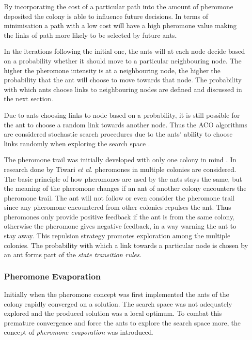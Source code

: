 By incorporating the cost of a particular path into the amount of pheromone deposited the colony is able to influence future decisions\cite{CompuIntelligenceIntro}. In terms of minimisation a path with a low cost will have a high pheromone value making the links of path more likely to be selected by future ants\cite{CompuIntelligenceIntro}.

In the iterations following the initial one, the ants will at each node decide based on a probability whether it should move to a particular neighbouring node. The higher the pheromone intensity is at a neighbouring node, the higher the probability that the ant will choose to move towards that node\cite{AntQAP,AntsAndStigmergy,CompuIntelligenceIntro}. The probability with which ants choose links to neighbouring nodes are defined and discussed in the next section.

Due to ants choosing links to node based on a probability, it is still possible for the ant to choose a random link towards another node. Thus the \gls{ACO} algorithms are considered stochastic search procedures due to the ants' ability to choose links randomly when exploring the search space \cite{ACOSurvey,ImpACOComplex}.

The pheromone trail was initially developed with only one colony in mind \cite{CompuIntelligenceIntro}. In research done by Tiwari \emph{et al.}\cite{ACOLargeProblem} pheromones in multiple colonies are considered. The basic principle of how pheromones are used by the ants stays the same, but the meaning of the pheromone changes if an ant of another colony encounters the pheromone trail\cite{AntQAP,AntsAndStigmergy,CompuIntelligenceIntro}. The ant will not follow or even consider the pheromone trail since any pheromone encountered from other colonies repulses the ant\cite{ACOLargeProblem}. Thus pheromones only provide positive feedback if the ant is from the same colony, otherwise the pheromone gives negative feedback, in a way warning the ant to stay away\cite{ACOLargeProblem}. This repulsion strategy promotes exploration among the multiple colonies\cite{ACOLargeProblem}. The probability with which a link towards a particular node is chosen by an ant forms part of the \emph{state transition rules}.

\subsubsection{Pheromone Evaporation}
\label{sec:pheromoneevapuation}
Initially when the pheromone concept was first implemented the ants of the colony rapidly converged on a solution\cite{CompuIntelligenceIntro}. The search space was not adequately explored and the produced solution was a local optimum\cite{AntsAndStigmergy}. To combat this premature convergence and force the ants to explore the search space more, the concept of \emph{pheromone evaporation} was introduced\cite{AntIntroTrends,AntSurvey}. 

